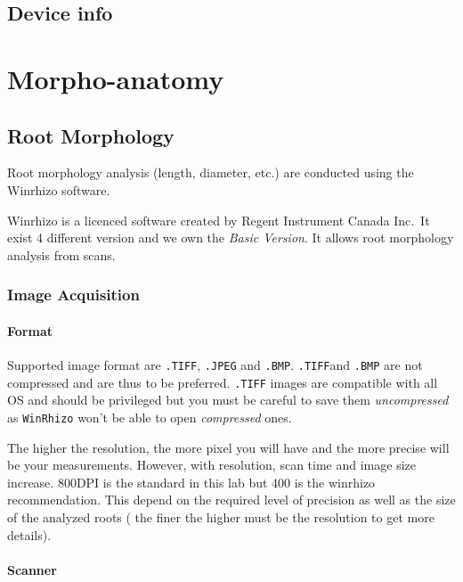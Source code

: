 \documentclass[
  12pt,
  american,
  a4paper,
  extrafontsizes,onecolumn,openright
  ]{memoir}
\begin{document}
\hypertarget{device-info}{%
\section{Device info}\label{device-info}}

\hypertarget{morpho-anatomy-1}{%
\chapter{Morpho-anatomy}\label{morpho-anatomy-1}}

\hypertarget{root-morphology}{%
\section{Root Morphology}\label{root-morphology}}

Root morphology analysis (length, diameter, etc.) are conducted using the Winrhizo software.

Winrhizo is a licenced software created by Regent Instrument Canada Inc.~It exist 4 different version and we own the \emph{Basic Version}. It allows root morphology analysis from scans.

\hypertarget{image-acquisition}{%
\subsection{Image Acquisition}\label{image-acquisition}}

\hypertarget{format}{%
\subsubsection{Format}\label{format}}

Supported image format are \texttt{.TIFF}, \texttt{.JPEG} and \texttt{.BMP}. \texttt{.TIFF}and \texttt{.BMP} are not compressed and are thus to be preferred. \texttt{.TIFF} images are compatible with all OS and should be privileged but you must be careful to save them \emph{uncompressed} as \texttt{WinRhizo} won't be able to open \emph{compressed} ones.

The higher the resolution, the more pixel you will have and the more precise will be your measurements. However, with resolution, scan time and image size increase. 800DPI is the standard in this lab but 400 is the winrhizo recommendation. This depend on the required level of precision as well as the size of the analyzed roots ( the finer the higher must be the resolution to get more details).

\hypertarget{scanner}{%
\subsubsection{Scanner}\label{scanner}}
\end{document}
